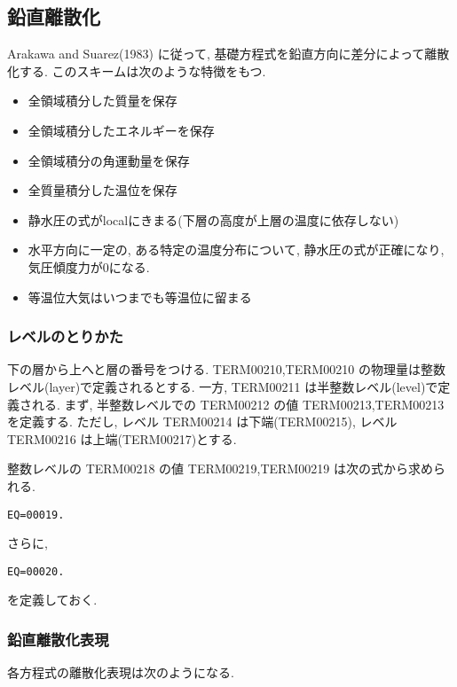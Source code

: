 ﻿
\subsection{鉛直離散化}

Arakawa and Suarez(1983) に従って, 
基礎方程式を鉛直方向に差分によって離散化する.
このスキームは次のような特徴をもつ.
%
\begin{itemize}
\item 全領域積分した質量を保存
\item 全領域積分したエネルギーを保存
\item 全領域積分の角運動量を保存
\item 全質量積分した温位を保存
\item 静水圧の式がlocalにきまる(下層の高度が上層の温度に依存しない)
\item 水平方向に一定の, ある特定の温度分布について,
      静水圧の式が正確になり, 気圧傾度力が0になる.
\item 等温位大気はいつまでも等温位に留まる
\end{itemize}      

\subsubsection{レベルのとりかた}

下の層から上へと層の番号をつける.
TERM00210,TERM00210 の物理量は整数レベル(layer)で定義されるとする.
一方, TERM00211 は半整数レベル(level)で定義される.
%
まず, 半整数レベルでの TERM00212 の値
TERM00213,TERM00213
を定義する.
%
ただし, レベル TERM00214 は下端(TERM00215),
レベル TERM00216 は上端(TERM00217)とする.

整数レベルの TERM00218 の値
TERM00219,TERM00219
は次の式から求められる.
%
\begin{verbatim}
EQ=00019.
\end{verbatim}
%
さらに,
\begin{verbatim}
EQ=00020.
\end{verbatim}
を定義しておく.

\subsubsection{鉛直離散化表現}

各方程式の離散化表現は次のようになる.

